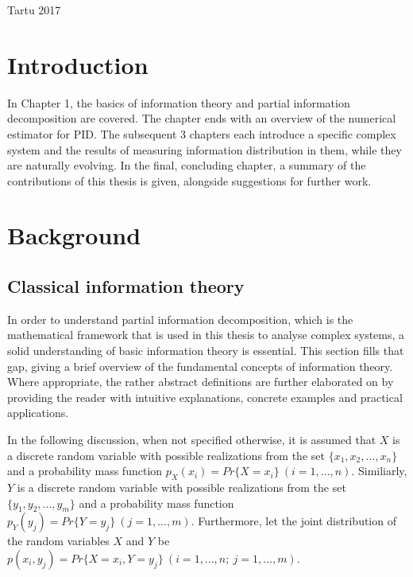 \documentclass[12pt]{article}
\begin{document}
\vfill
\centerline{Tartu 2017}



\newpage
\tableofcontents

\newpage
\section*{Introduction}



In Chapter 1, the basics of information theory and partial information decomposition are covered. The chapter ends with an overview of the numerical estimator for PID. The subsequent 3 chapters each introduce a specific complex system and the results of measuring information distribution in them, while they are naturally evolving. In the final, concluding chapter, a summary of the contributions of this thesis is given, alongside suggestions for further work. 

\newpage

\section{Background}

\subsection{Classical information theory}

In order to understand partial information decomposition, which is the mathematical framework that is used in this thesis to analyse complex systems, a solid understanding of basic information theory is essential. This section fills that gap, giving a brief overview of the fundamental concepts of information theory. Where appropriate, the rather abstract definitions are further elaborated on by providing the reader with intuitive explanations, concrete examples and practical applications. 

In the following discussion, when not specified otherwise, it is assumed that $X$ is a discrete random variable with possible realizations from the set $\{x_1, x_2, ..., x_n\}$ and a probability mass function $p_X(x_i) = Pr\{X = x_i\} \ (i = 1, ..., n)$. Similiarly, $Y$ is a discrete random variable with possible realizations from the set $\{y_1, y_2, ..., y_m\}$ and a probability mass function $p_Y(y_j) = Pr\{Y = y_j\} \ (j = 1, ..., m)$. Furthermore, let the joint distribution of the random variables $X$ and $Y$ be $p(x_i, y_j) = Pr\{X = x_i, Y = y_j\} \ (i = 1, ..., n; \ j = 1, ..., m)$. 
\end{document}
